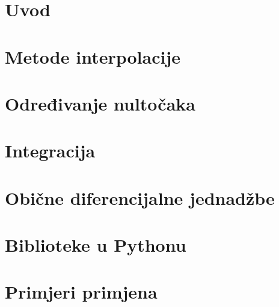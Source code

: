 \maketitle
\newpage
{}
\setcounter{page}{1}

\clearpage

\cleardoublepage
{}

\tableofcontents

\clearpage
{}

\chapter{Uvod}




\chapter{Metode interpolacije}









\chapter{Određivanje nultočaka}






\chapter{Integracija}





\chapter{Obične diferencijalne jednadžbe}



\pagebreak
{}

\chapter{Biblioteke u Pythonu}



\chapter{Primjeri primjena}

